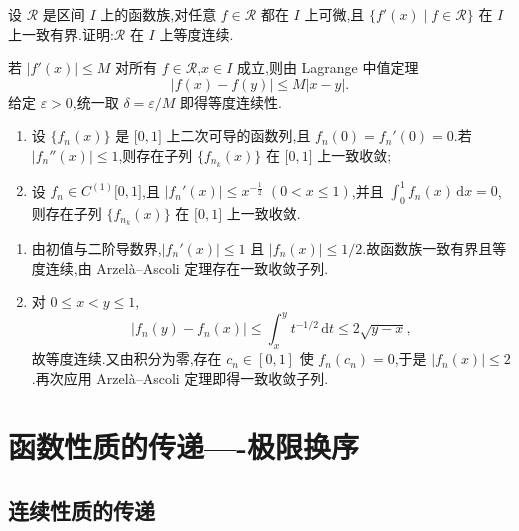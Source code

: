 \begin{example}
    设 $\mathscr R$ 是区间 $I$ 上的函数族,对任意 $f\in\mathscr R$ 都在 $I$ 上可微,且 $\{f'(x)\mid f\in\mathscr R\}$ 在 $I$ 上一致有界.证明:$\mathscr R$ 在 $I$ 上等度连续.
\end{example}
\exampleblank

\begin{solution}
    若 $|f'(x)|\leq M$ 对所有 $f\in\mathscr R$,$x\in I$ 成立,则由 Lagrange 中值定理
    \[
        |f(x)-f(y)|\leq M|x-y|.
    \]
    给定 $\varepsilon>0$,统一取 $\delta=\varepsilon/M$ 即得等度连续性.
\end{solution}

\begin{example}
    \begin{enumerate}
        \item 设 $\{f_n(x)\}$ 是 $\lbrack 0,1\rbrack$ 上二次可导的函数列,且 $f_n(0)=f_n'(0)=0$.若 $|f_n''(x)|\leq1$,则存在子列 $\{f_{n_k}(x)\}$ 在 $\lbrack 0,1\rbrack$ 上一致收敛;
        \item 设 $f_n\in C^{(1)}\lbrack 0,1\rbrack$,且 $|f_n'(x)|\leq x^{-\frac{1}{2}}$ $(0<x\leq1)$,并且 $\displaystyle\int_0^1f_n(x)\,\mathrm{d}x=0$,则存在子列 $\{f_{n_k}(x)\}$ 在 $\lbrack 0,1\rbrack$ 上一致收敛.
    \end{enumerate}
\end{example}
\exampleblank

\begin{solution}
    \leavevmode
    \begin{enumerate}
        \item 由初值与二阶导数界,$|f_n'(x)|\leq1$ 且 $|f_n(x)|\leq1/2$.故函数族一致有界且等度连续,由 Arzel\`a--Ascoli 定理存在一致收敛子列.
        \item 对 $0\leq x<y\leq1$,
              \[
                  |f_n(y)-f_n(x)|\leq\int_x^yt^{-1/2}\,\mathrm{d}t
                  \leq2\sqrt{y-x},
              \]
              故等度连续.又由积分为零,存在 $c_n\in[0,1]$ 使 $f_n(c_n)=0$,于是 $|f_n(x)|\leq2$.再次应用 Arzel\`a--Ascoli 定理即得一致收敛子列.
    \end{enumerate}
\end{solution}


\newpage

\section{函数性质的传递----极限换序}


\subsection{连续性质的传递}

